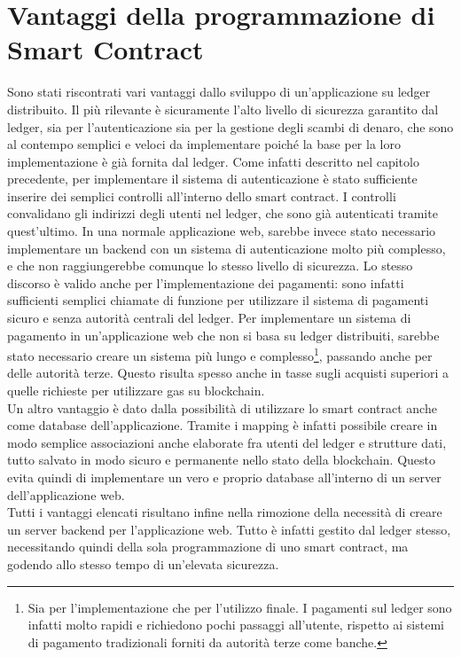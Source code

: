 \documentclass[12pt,a4paper,openright,twoside]{report}
\begin{document}
\section{Vantaggi della programmazione di Smart Contract}
Sono stati riscontrati vari vantaggi dallo sviluppo di un'applicazione su ledger distribuito. Il più rilevante è sicuramente l'alto livello di sicurezza garantito dal ledger, sia per l'autenticazione sia per la gestione degli scambi di denaro, che sono al contempo semplici e veloci da implementare poiché la base per la loro implementazione è già fornita dal ledger. Come infatti descritto nel capitolo precedente, per implementare il sistema di autenticazione è stato sufficiente inserire dei semplici controlli all'interno dello smart contract. I controlli convalidano gli indirizzi degli utenti nel ledger, che sono già autenticati tramite quest'ultimo. In una normale applicazione web, sarebbe invece stato necessario implementare un backend con un sistema di autenticazione molto più complesso, e che non raggiungerebbe comunque lo stesso livello di sicurezza. Lo stesso discorso è valido anche per l'implementazione dei pagamenti: sono infatti sufficienti semplici chiamate di funzione per utilizzare il sistema di pagamenti sicuro e senza autorità centrali del ledger. Per implementare un sistema di pagamento in un'applicazione web che non si basa su ledger distribuiti, sarebbe stato necessario creare un sistema più lungo e complesso\footnote{Sia per l'implementazione che per l'utilizzo finale. I pagamenti sul ledger sono infatti molto rapidi e richiedono pochi passaggi all'utente, rispetto ai sistemi di pagamento tradizionali forniti da autorità terze come banche.}, passando anche per delle autorità terze. Questo risulta spesso anche in tasse sugli acquisti superiori a quelle richieste per utilizzare gas su blockchain.\\
Un altro vantaggio è dato dalla possibilità di utilizzare lo smart contract anche come database dell'applicazione. Tramite i mapping è infatti possibile creare in modo semplice associazioni anche elaborate fra utenti del ledger e strutture dati, tutto salvato in modo sicuro e permanente nello stato della blockchain. Questo evita quindi di implementare un vero e proprio database all'interno di un server dell'applicazione web.\\
Tutti i vantaggi elencati risultano infine nella rimozione della necessità di creare un server backend per l'applicazione web. Tutto è infatti gestito dal ledger stesso, necessitando quindi della sola programmazione di uno smart contract, ma godendo allo stesso tempo di un'elevata sicurezza.\\
\end{document}
